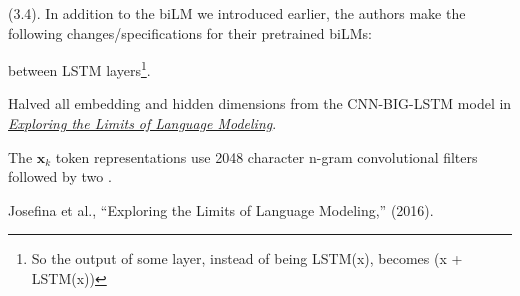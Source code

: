 \documentclass[11pt]{article}
\renewcommand\vec[2][]{\bm{#2}_{#1}}
\newcommand\myspace[1][]{\vspace{#1\bigskipamount}}
\newcommand\p{\Needspace{10\baselineskip} \noindent}
\begin{document}
\myspace
\p {} (3.4). In addition to the biLM we introduced earlier, the authors make the following changes/specifications for their pretrained biLMs:
\begin{compactitem}
	\item  {} between LSTM layers\footnote{So the output of some layer, instead of being LSTM(x), becomes (x + LSTM(x))}.
	
	\item Halved all embedding and hidden dimensions from the CNN-BIG-LSTM model in \href{https://arxiv.org/abs/1602.02410}{\textit{Exploring the Limits of Language Modeling}}. 
	
	\item The $\vec[k]{x}$ token representations use 2048 character n-gram convolutional filters followed by two . 
\end{compactitem}










\vspace{-1em}
{\footnotesize Josefina et al., ``Exploring the Limits of Language Modeling,'' (2016).}
\end{document}
